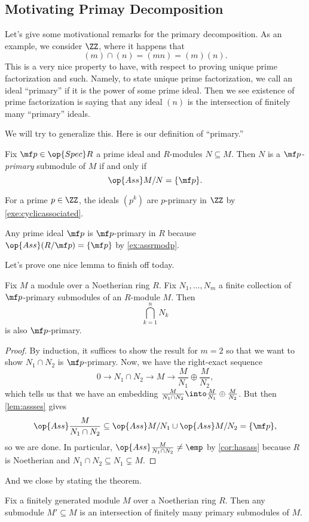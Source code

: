 \subsection{Motivating Primay Decomposition}
Let's give some motivational remarks for the primary decomposition. As an example, we consider $\ZZ$, where it happens that
\[(m)\cap(n)=(mn)=(m)(n).\]
This is a very nice property to have, with respect to proving unique prime factorization and such. Namely, to state unique prime factorization, we call an ideal ``primary'' if it is the power of some prime ideal. Then we see existence of prime factorization is saying that any ideal $(n)$ is the intersection of finitely many ``primary'' ideals.

We will try to generalize this. Here is our definition of ``primary.''
\begin{definition}
	Fix $\mf p\in\op{Spec}R$ a prime ideal and $R$-modules $N\subseteq M$. Then $N$ is a \textit{$\mf p$-primary} submodule of $M$ if and only if
	\[\op{Ass}M/N=\{\mf p\}.\]
\end{definition}
\begin{example}
	For a prime $p\in\ZZ$, the ideals $\left(p^k\right)$ are $p$-primary in $\ZZ$ by \autoref{exe:cyclicassociated}.
\end{example}
\begin{example}
	Any prime ideal $\mf p$ is $\mf p$-primary in $R$ because $\op{Ass}(R/\mf p)=\{\mf p\}$ by \autoref{ex:assrmodp}.
\end{example}
Let's prove one nice lemma to finish off today.
\begin{lemma}
	Fix $M$ a module over a Noetherian ring $R$. Fix $N_1,\ldots,N_m$ a finite collection of $\mf p$-primary submodules of an $R$-module $M$. Then
	\[\bigcap_{k=1}^nN_k\]
	is also $\mf p$-primary.
\end{lemma}
\begin{proof}
	By induction, it suffices to show the result for $m=2$ so that we want to show $N_1\cap N_2$ is $\mf p$-primary. Now, we have the right-exact sequence
	\[0\to N_1\cap N_2\to M\to\frac M{N_1}\oplus\frac M{N_2},\]
	which tells us that we have an embedding $\frac M{N_1\cap N_2}\into\frac M{N_1}\oplus\frac M{N_2}$. But then \autoref{lem:assses} gives
	\[\op{Ass}\frac M{N_1\cap N_2}\subseteq\op{Ass}M/N_1\cup\op{Ass}M/N_2=\{\mf p\},\]
	so we are done. In particular, $\op{Ass}\frac M{N_1\cap N_2}\ne\emp$ by \autoref{cor:hasass} because $R$ is Noetherian and $N_1\cap N_2\subseteq N_1\subsetneq M$.
\end{proof}
And we close by stating the theorem.
\begin{theorem}
	Fix a finitely generated module $M$ over a Noetherian ring $R$. Then any submodule $M'\subseteq M$ is an intersection of finitely many primary submodules of $M$.
\end{theorem}